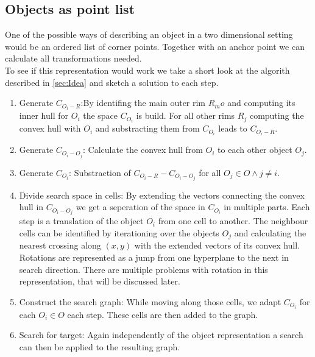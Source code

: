 \subsection{Objects as point list}
One of the possible ways of describing an object in a two dimensional setting would be an ordered list of corner points.  Together with an anchor point we can calculate all transformations needed.\\
To see if this representation would work we take a short look at the algorith described in \ref{sec:Idea} and sketch a solution to each step.
\begin{enumerate}
\item Generate $C_{O_i-R}$:By identifing the main outer rim $R_mo$ and computing its inner hull for $O_i$ the space $C_{O_i}$ is build. For all other rims $R_j$ computing the convex hull with $O_i$ and substracting them from $C_{O_i}$ leads to $C_{O_i-R}$.
\item Generate $C_{O_i-O_j}$: Calculate the convex hull from $O_i$ to each other object $O_j$.
\item Generate $C_{O_i}$: Substraction of $C_{O_i-R} - C_{O_i-O_j}$ for all $O_j \in O \wedge j \neq i$.
\item Divide search space in cells: By extending the vectors connecting the convex hull in $C_{O_i-O_j}$ we get a seperation of the space in $C_{O_i}$ in multiple parts. Each step is a translation of the object $O_i$  from one cell to another. The neighbour cells can be identified by iterationing over the objects $O_j$ and calculating the nearest crossing along $(x,y)$ with the extended vectors of its convex hull. \\ Rotations are represented as a jump from one hyperplane to the next in search direction. There are multiple problems with rotation in this representation, that will be discussed later.
\item Construct the search graph: While moving along those cells, we adapt $C_{O_i}$ for each $O_i \in O$ each step. These cells are then added to the graph.
\item Search for target: Again independently of the object representation a search can then be applied to the resulting graph. 
\end{enumerate}

